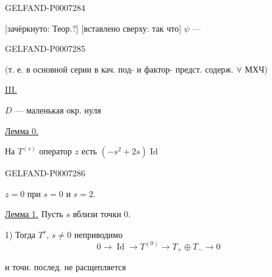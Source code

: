 \begin{GelfandAdjacentEvidence}{GELFAND-P000728}{4}


[зачёркнуто: Теор.?] [вставлено сверху: так что] \(\psi\) --- 
\end{GelfandAdjacentEvidence}
\begin{GelfandAdjacentEvidence}{GELFAND-P000728}{5}


(т. е. в основной серии в кач. под- и фактор- предст. содерж. \(\forall\) МХЧ)

\underline{III.}\quad {}

\(D\) --- маленькая окр. нуля

\underline{Лемма 0.}

На \(T^{(s)}\) оператор \(z\) есть \((-s^2+2s)\operatorname{Id}\)
\end{GelfandAdjacentEvidence}
\begin{GelfandAdjacentEvidence}{GELFAND-P000728}{6}


\(z=0\) при \(s=0\) и \(s=2\).

\underline{Лемма 1.} Пусть \(s\) вблизи точки 0.

1) Тогда \(T^s\), \(s\ne 0\) неприводимо
\[
0\longrightarrow\operatorname{Id}\longrightarrow T^{(0)}
\longrightarrow T_+\oplus T_-\longrightarrow 0
\]
\end{GelfandAdjacentEvidence}

и точн. послед. не расщепляется



